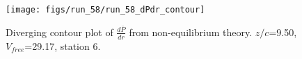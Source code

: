 \begin{figure}[H]
\centering
\texttt{[image: figs/run\_58/run\_58\_dPdr\_contour]}
\caption{Diverging contour plot of $\frac{d\bar{P}}{dr}$ from non-equilibrium theory. $z/c$=9.50, $V_{free}$=29.17, station 6.}
\label{fig:run_58_dPdr_contour}
\end{figure}


